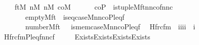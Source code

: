 \begin{isabellebody}
\ \ \ \ \ {\isasymexists}ft{\isacharbrackleft}{\kern0pt}M{\isacharbrackright}{\kern0pt}{\isachardot}{\kern0pt}\ {\isasymexists}n{}{\isacharbrackleft}{\kern0pt}M{\isacharbrackright}{\kern0pt}{\isachardot}{\kern0pt}\ {\isasymexists}n{}{\isacharbrackleft}{\kern0pt}M{\isacharbrackright}{\kern0pt}{\isachardot}{\kern0pt}\ {\isasymexists}co{\isacharbrackleft}{\kern0pt}M{\isacharbrackright}{\kern0pt}{\isachardot}{\kern0pt}\isanewline
\ \ \ \ \ \ co{\isasymin}P\ {\isasymand}\ is{\isacharunderscore}{\kern0pt}tuple{\isacharparenleft}{\kern0pt}M{\isacharcomma}{\kern0pt}ft{\isacharcomma}{\kern0pt}n{}{\isacharcomma}{\kern0pt}n{}{\isacharcomma}{\kern0pt}co{\isacharcomma}{\kern0pt}fnnc{\isacharparenright}{\kern0pt}\ {\isasymand}\isanewline
\ \ \ \ \ \ {\isacharparenleft}{\kern0pt}\ \ {\isacharparenleft}{\kern0pt}empty{\isacharparenleft}{\kern0pt}M{\isacharcomma}{\kern0pt}ft{\isacharparenright}{\kern0pt}\ {\isasymand}\ is{\isacharunderscore}{\kern0pt}eq{\isacharunderscore}{\kern0pt}case{\isacharparenleft}{\kern0pt}M{\isacharcomma}{\kern0pt}n{}{\isacharcomma}{\kern0pt}n{}{\isacharcomma}{\kern0pt}co{\isacharcomma}{\kern0pt}P{\isacharcomma}{\kern0pt}leq{\isacharcomma}{\kern0pt}f{\isacharparenright}{\kern0pt}{\isacharparenright}{\kern0pt}\isanewline
\ \ \ \ \ \ \ {\isasymor}\ {\isacharparenleft}{\kern0pt}number{}{\isacharparenleft}{\kern0pt}M{\isacharcomma}{\kern0pt}ft{\isacharparenright}{\kern0pt}\ {\isasymand}\ \ is{\isacharunderscore}{\kern0pt}mem{\isacharunderscore}{\kern0pt}case{\isacharparenleft}{\kern0pt}M{\isacharcomma}{\kern0pt}n{}{\isacharcomma}{\kern0pt}n{}{\isacharcomma}{\kern0pt}co{\isacharcomma}{\kern0pt}P{\isacharcomma}{\kern0pt}leq{\isacharcomma}{\kern0pt}f{\isacharparenright}{\kern0pt}{\isacharparenright}{\kern0pt}{\isacharparenright}{\kern0pt}{\isachardoublequoteclose}\isanewline
\isanewline
{}\isamarkupfalse%
\isanewline
\ \ Hfrc{\isacharunderscore}{\kern0pt}fm\ {\isacharcolon}{\kern0pt}{\isacharcolon}{\kern0pt}\ {\isachardoublequoteopen}{\isacharbrackleft}{\kern0pt}i{\isacharcomma}{\kern0pt}i{\isacharcomma}{\kern0pt}i{\isacharcomma}{\kern0pt}i{\isacharbrackright}{\kern0pt}\ {\isasymRightarrow}\ i{\isachardoublequoteclose}\ \isanewline
\ \ {\isachardoublequoteopen}Hfrc{\isacharunderscore}{\kern0pt}fm{\isacharparenleft}{\kern0pt}P{\isacharcomma}{\kern0pt}leq{\isacharcomma}{\kern0pt}fnnc{\isacharcomma}{\kern0pt}f{\isacharparenright}{\kern0pt}\ {\isasymequiv}\isanewline
\ \ \ \ Exists{\isacharparenleft}{\kern0pt}Exists{\isacharparenleft}{\kern0pt}Exists{\isacharparenleft}{\kern0pt}Exists{\isacharparenleft}{\kern0pt}\isanewline

\end{isabellebody}
